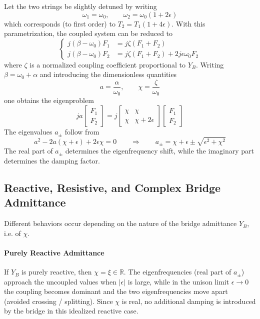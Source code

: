 Let the two strings be slightly detuned by writing
\[
\omega_1 = \omega_0,
\qquad
\omega_2 = \omega_0(1+2\epsilon)
\]
which corresponds (to first order) to \( T_2 = T_1(1+4\epsilon) \).
With this parametrization, the coupled system can be reduced to
\[
\left\{
\begin{aligned}
j(\beta-\omega_0)F_1 & = j\zeta(F_1+F_2)\\
j(\beta-\omega_0)F_2 & = j\zeta(F_1+F_2)+2j\epsilon\omega_0 F_2
\end{aligned}
\right.
\]
where \( \zeta \) is a normalized coupling coefficient proportional to \( Y_B \).
Writing \( \beta = \omega_0+\alpha \) and introducing the dimensionless quantities
\[
a = \frac{\alpha}{\omega_0},\qquad \chi = \frac{\zeta}{\omega_0}
\]
one obtains the eigenproblem
\[
ja
\begin{bmatrix}
F_1\\F_2
\end{bmatrix}
 = 
j
\begin{bmatrix}
\chi & \chi\\
\chi & \chi+2\epsilon
\end{bmatrix}
\begin{bmatrix}
F_1\\F_2
\end{bmatrix}
\]
The eigenvalues \( a_\pm \) follow from
\[
a^{2}-2a(\chi+\epsilon)+2\epsilon\chi = 0
\qquad\Longrightarrow\qquad
a_\pm = \chi+\epsilon\pm\sqrt{\epsilon^{2}+\chi^{2}}
\]
The real part of \( a_\pm \) determines the eigenfrequency shift, while the imaginary part determines the damping factor.

\subsection{Reactive, Resistive, and Complex Bridge Admittance}

Different behaviors occur depending on the nature of the bridge admittance \( Y_B \), i.e. of \( \chi \).

\paragraph{Purely Reactive Admittance} If \( Y_B \) is purely reactive, then \( \chi = \xi\in\mathbb{R} \). The eigenfrequencies (real part of \( a_\pm \)) approach the uncoupled values when \( |\epsilon| \) is large, while in the unison limit \( \epsilon\to 0 \) the coupling becomes dominant and the two eigenfrequencies move apart (avoided crossing / splitting). Since \( \chi \) is real, no additional damping is introduced by the bridge in this idealized reactive case.

